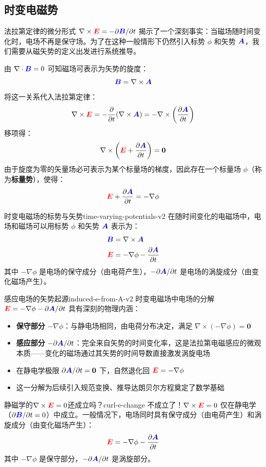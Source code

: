 \documentclass[11pt,a4paper,openany,oneside]{book}
\newcommand{\vecE}{\textcolor{red}{\vect{E}}}
\newcommand{\vecB}{\textcolor{blue}{\vect{B}}}
\newcommand{\vecA}{\textcolor{blue!70!black}{\vect{A}}}
\newcommand{\vect}[1]{\bm{#1}}
\newcommand{\grad}{\nabla}
\newcommand{\curl}{\nabla\times}
\newcommand{\divg}{\nabla\cdot}
\begin{document}
\subsection{时变电磁势}

法拉第定律的微分形式 $\curl\vecE = -\partial\vecB/\partial t$ 揭示了一个深刻事实：当磁场随时间变化时，电场不再是保守场。为了在这种一般情形下仍然引入标势 $\phi$ 和矢势 $\vecA$，我们需要从磁矢势的定义出发进行系统推导。

由 $\divg\vecB = 0$ 可知磁场可表示为矢势的旋度：
\[
\vecB = \curl\vecA
\]
将这一关系代入法拉第定律：
\[
\curl\vecE = -\frac{\partial}{\partial t}(\curl\vecA) = -\curl\left(\frac{\partial\vecA}{\partial t}\right)
\]
移项得：
\[
\curl\left(\vecE + \frac{\partial\vecA}{\partial t}\right) = \vect{0}
\]
由于旋度为零的矢量场必可表示为某个标量场的梯度，因此存在一个标量场 $\phi$（称为\textbf{标量势}），使得：
\[
\vecE + \frac{\partial\vecA}{\partial t} = -\grad\phi
\]

\begin{theorem}{时变电磁场的标势与矢势}{time-varying-potentials-v2}
在随时间变化的电磁场中，电场和磁场可以用标势 $\phi$ 和矢势 $\vecA$ 表示为：
\begin{align}
\vecB &= \curl\vecA \\
\vecE &= -\grad\phi - \frac{\partial\vecA}{\partial t}
\end{align}
其中 $-\grad\phi$ 是电场的保守成分（由电荷产生），$-\partial\vecA/\partial t$ 是电场的涡旋成分（由变化磁场产生）。
\end{theorem}

\begin{insight}{感应电场的矢势起源}{induced-e-from-A-v2}
时变电磁场中电场的分解 $\vecE = -\grad\phi - \partial\vecA/\partial t$ 具有深刻的物理内涵：
\begin{itemize}
\item \textbf{保守部分} $-\grad\phi$：与静电场相同，由电荷分布决定，满足 $\curl(-\grad\phi) = \vect{0}$
\item \textbf{感应部分} $-\partial\vecA/\partial t$：完全来自矢势的时间变化率，这是法拉第电磁感应的微观本质——变化的磁场通过其矢势的时间导数直接激发涡旋电场
\item 在静电学极限 $\partial\vecA/\partial t = \vect{0}$ 下，自然退化回 $\vecE = -\grad\phi$
\item 这一分解为后续引入规范变换、推导达朗贝尔方程奠定了数学基础
\end{itemize}
\end{insight}

\begin{warning}{静磁学的$\curl\vecE=0$还成立吗？}{curl-e-change}
不成立了！$\curl\vecE = 0$ 仅在静电学（$\partial\vecB/\partial t = 0$）中成立。一般情况下，电场同时具有保守成分（由电荷产生）和涡旋成分（由变化磁场产生）：
\[
\vecE = -\grad\phi - \frac{\partial\vecA}{\partial t}
\]
其中 $-\grad\phi$ 是保守部分，$-\partial\vecA/\partial t$ 是涡旋部分。
\end{warning}
\end{document}

